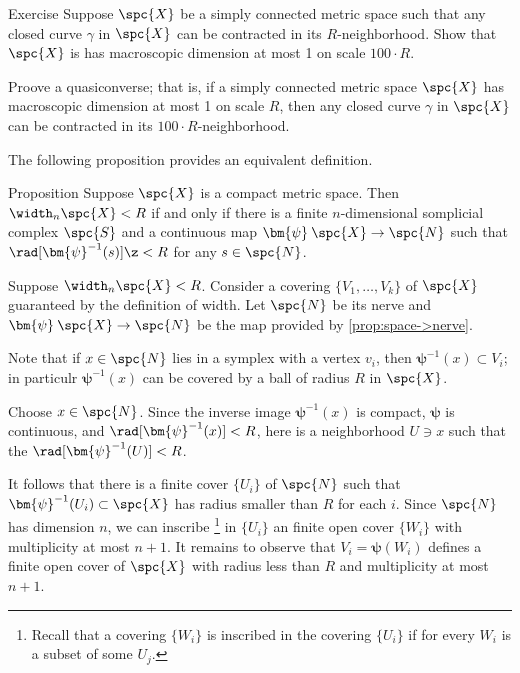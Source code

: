 \begin{thm}{Exercise}
Suppose $\spc{X}$ be a simply connected metric space such that any closed curve $\gamma$ in $\spc{X}$ can be contracted in its $R$-neighborhood.
Show that $\spc{X}$ is has macroscopic dimension at most 1 on scale $100\cdot R$.

Proove a quasiconverse; that is, if a simply connected metric space $\spc{X}$ has macroscopic dimension at most 1 on scale $R$, then any closed curve $\gamma$ in $\spc{X}$ can be contracted in its $100\cdot R$-neighborhood.
\end{thm}


The following proposition provides an equivalent definition.

\begin{thm}{Proposition}\label{prop:width=suprad(inv)}
Suppose $\spc{X}$ is a compact metric space.
Then $\width_n\spc{X}<R$ if and only if there is a finite $n$-dimensional somplicial complex $\spc{S}$ and a continuous map $\bm{\psi}\:\spc{X}\to \spc{N}$
such that $\rad[\bm{\psi}^{-1}(s)]\z<R$
for any $s\in \spc{N}$.
\end{thm}

Suppose $\width_n\spc{X}<R$.
Consider a covering $\{V_1,\dots,V_k\}$ of $\spc{X}$ guaranteed by the definition of width.
Let $\spc{N}$ be its nerve and $\bm{\psi}\:\spc{X}\to \spc{N}$ be the map provided by \ref{prop:space->nerve}.

Note that if $x\in \spc{N}$ lies in a symplex with a vertex $v_i$,
then $\bm{\psi}^{-1}(x)\subset V_i$;
in particulr $\bm{\psi}^{-1}(x)$ can be covered by a ball of radius $R$ in $\spc{X}$.

Choose $x\in \spc{N}$.
Since the inverse image $\bm{\psi}^{-1}(x)$ is compact, $\bm{\psi}$ is continuous, and $\rad[\bm{\psi}^{-1}(x)]<R$,
here is a neighborhood $U\ni x$ such that the  $\rad[\bm{\psi}^{-1}(U)]<R$.

It follows that there is a finite cover $\{U_i\}$ of $\spc{N}$ such that $\bm{\psi}^{-1}(U_i)\subset\spc{X}$ has radius smaller than $R$ for each $i$.
Since $\spc{N}$ has dimension $n$, we can inscribe%
\footnote{Recall that a covering $\{W_i\}$ is inscribed in the covering $\{U_i\}$ if for every $W_i$ is a subset of some $U_j$.} 
in $\{U_i\}$ an finite open cover $\{W_i\}$ with multiplicity at most $n+1$.
It remains to observe that $V_i=\bm{\psi}(W_i)$ defines a finite open cover of $\spc{X}$ with radius less than $R$ and multiplicity at most $n+1$. 
\qeds

